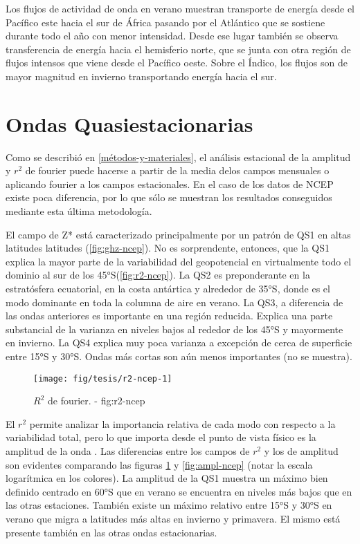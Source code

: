 \documentclass[spanish,a4paper]{book}
\begin{document}
Los flujos de actividad de onda en verano muestran transporte de energía
desde el Pacífico este hacia el sur de África pasando por el Atlántico
que se sostiene durante todo el año con menor intensidad. Desde ese
lugar también se observa transferencia de energía hacia el hemisferio
norte, que se junta con otra región de flujos intensos que viene desde
el Pacífico oeste. Sobre el Índico, los flujos son de mayor magnitud en
invierno transportando energía hacia el sur.

\section{Ondas Quasiestacionarias}\label{ondas-quasiestacionarias}

Como se describió en \autoref{métodos-y-materiales}, el análisis
estacional de la amplitud y \(r^2\) de fourier puede hacerse a partir de
la media delos campos mensuales o aplicando fourier a los campos
estacionales. En el caso de los datos de NCEP existe poca diferencia,
por lo que sólo se muestran los resultados conseguidos mediante esta
última metodología.

El campo de Z* está caracterizado principalmente por un patrón de QS1 en
altas latitudes latitudes (\autoref{fig:ghz-ncep}). No es sorprendente,
entonces, que la QS1 explica la mayor parte de la variabilidad del
geopotencial en virtualmente todo el dominio al sur de los
45°S(\autoref{fig:r2-ncep}). La QS2 es preponderante en la estratósfera
ecuatorial, en la costa antártica y alrededor de 35°S, donde es el modo
dominante en toda la columna de aire en verano. La QS3, a diferencia de
las ondas anteriores es importante en una región reducida. Explica una
parte substancial de la varianza en niveles bajos al rededor de los 45°S
y mayormente en invierno. La QS4 explica muy poca varianza a excepción
de cerca de superficie entre 15°S y 30°S. Ondas más cortas son aún menos
importantes (no se muestra).

\begin{landscape}\begin{figure}

{\centering \texttt{[image: fig/tesis/r2-ncep-1]} 

}

\caption{$R^2$ de fourier. - fig:r2-ncep}\label{fig:r2-ncep}
\end{figure}
\end{landscape}

El \(r^2\) permite analizar la importancia relativa de cada modo con
respecto a la variabilidad total, pero lo que importa desde el punto de
vista físico es la amplitud de la onda
. Las diferencias entre
los campos de \(r^2\) y los de amplitud son evidentes comparando las
figuras \ref{fig:r2-ncep} y \ref{fig:ampl-ncep} (notar la escala
logarítmica en los colores). La amplitud de la QS1 muestra un máximo
bien definido centrado en 60°S que en verano se encuentra en niveles más
bajos que en las otras estaciones. También existe un máximo relativo
entre 15°S y 30°S en verano que migra a latitudes más altas en invierno
y primavera. El mismo está presente también en las otras ondas
estacionarias.
\end{document}
